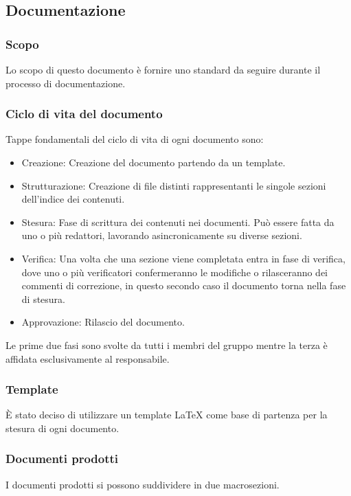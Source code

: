 \subsection{Documentazione}

\subsubsection{Scopo}
Lo scopo di questo documento è fornire uno standard da seguire durante il processo di documentazione.

\subsubsection{Ciclo di vita del documento}
Tappe fondamentali del ciclo di vita di ogni documento sono:
  \begin{itemize}
    \item Creazione: Creazione del documento partendo da un template.
    \item Strutturazione: Creazione di file distinti rappresentanti le singole sezioni dell'indice dei contenuti.
    \item Stesura: Fase di scrittura dei contenuti nei documenti. Può essere fatta da uno o più redattori, lavorando
      asincronicamente su diverse sezioni.
    \item Verifica: Una volta che una sezione viene completata entra in fase di verifica, dove uno o più verificatori
      confermeranno le modifiche o rilasceranno dei commenti di correzione, in questo secondo caso il documento torna
      nella fase di stesura.
    \item Approvazione: Rilascio del documento.
  \end{itemize}
  Le prime due fasi sono svolte da tutti i membri del gruppo mentre la terza è affidata esclusivamente al responsabile.

\subsubsection{Template}
È stato deciso di utilizzare un template LaTeX %
come base di partenza per la stesura di ogni documento.

\subsubsection{Documenti prodotti}
I documenti prodotti si possono suddividere in due macrosezioni.


